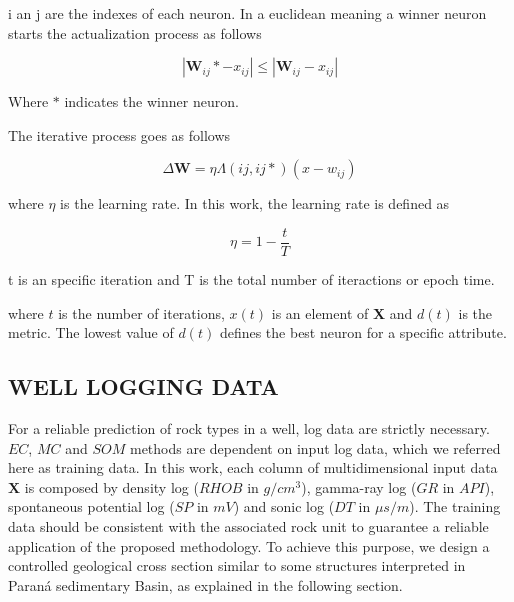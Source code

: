 \documentclass[preprint,12pt]{elsarticle}
\begin{document}
i an j are the indexes of each neuron. In a euclidean meaning a winner neuron starts the actualization process as follows

\begin{equation}
     |\textbf{W}_{ij} \ast - x_{ij}| \leq |\textbf{W}_{ij} - x_{ij}| 
\end{equation}

Where $\ast$ indicates the winner neuron. 


The iterative process goes as follows

\begin{equation}
 \Delta \textbf{W}  = \eta \Lambda (ij,ij\ast) (x - w_{ij})
\end{equation}


where $\eta$ is the learning rate. In this work, the learning rate is defined as

\begin{equation}
  \eta = 1 - \frac{t}{T}
\end{equation}

t is an specific iteration and T is the total number of iteractions or epoch time. 





 where $t$ is the number of iterations, $x(t)$ is an element of \textbf{X} and $d(t)$ is the metric. The lowest value of $d(t)$ defines the best neuron for a specific attribute.

\subsection{WELL LOGGING DATA}
\label{sub:WLG}
For a reliable prediction of rock types in a well, log data are strictly necessary. $EC$, $MC$ and $SOM$ methods are dependent on input log data, which we referred here as training data. In this work, each column of multidimensional input data $\mathbf{X}$ is composed by density log ($RHOB$ in $g/cm^3$), gamma-ray log ($GR$ in $API$), spontaneous potential log ($SP$ in $mV$) and sonic log ($DT$ in $\mu s/ m$). The training data should be consistent with the associated rock unit to guarantee a reliable application of the proposed methodology. To achieve this purpose, we design a controlled geological cross section similar to some structures interpreted in Paran\'a sedimentary Basin, as explained in the following section.
\end{document}
